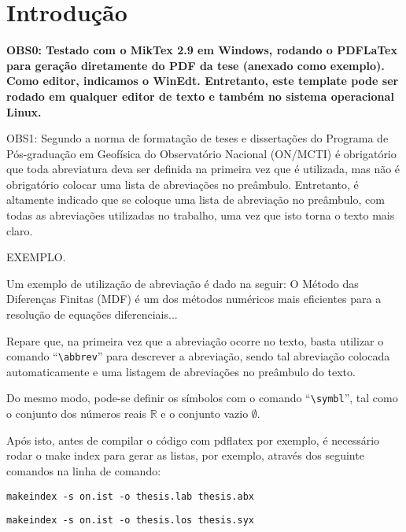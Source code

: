 \chapter{Introdução}

\textbf{OBS0: Testado com o MikTex 2.9 em Windows, rodando o PDFLaTex para geração diretamente do PDF da tese (anexado como exemplo). Como editor, indicamos o WinEdt. Entretanto, este template pode ser rodado em qualquer editor de texto e também no sistema operacional Linux.}

OBS1: Segundo a norma de formatação de teses e disserta{\c c}\~oes do
Programa de Pós-graduação em Geofísica do Observatório Nacional (ON/MCTI)
é obrigatório que toda abreviatura deva ser definida na primeira vez que é
utilizada, mas não é obrigatório colocar uma lista de abreviações no preâmbulo.
Entretanto, é altamente indicado que se coloque uma lista de abreviação no
preâmbulo, com todas as abreviações utilizadas no trabalho, uma vez que isto
torna o texto mais claro.

EXEMPLO.

Um exemplo de utilização de abreviação é dado na seguir: O Método das Diferenças Finitas
(MDF) é um dos métodos numéricos mais eficientes
para a resolução de equações diferenciais...

Repare que, na primeira vez que a abreviação ocorre no texto, basta utilizar o comando
``\verb|\abbrev|'' para descrever a abreviação, sendo tal abreviação colocada automaticamente
e uma listagem de abreviações no preâmbulo do texto.

Do mesmo modo, pode-se definir os símbolos com o comando ``\verb|\symbl|'', tal como o
conjunto dos números reais $\mathbb{R}$ e o conjunto vazio $\emptyset$.

Após isto, antes de compilar o código com pdflatex por exemplo, é necessário rodar o make index
para gerar as listas, por exemplo, através dos seguinte comandos na linha de comando:

\verb|makeindex -s on.ist -o thesis.lab thesis.abx|

\verb|makeindex -s on.ist -o thesis.los thesis.syx|

